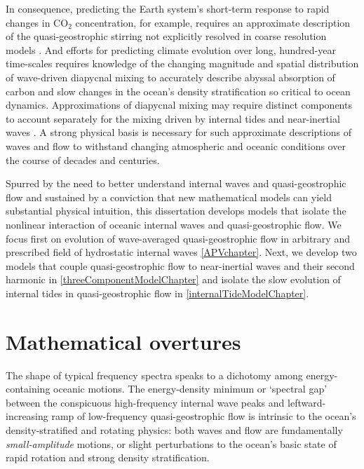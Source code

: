 \documentclass[12pt, oneside]{book}
\begin{document}
In consequence, predicting the Earth system's short-term response to rapid changes in CO$_2$ concentration, for example, requires an approximate description of the quasi-geostrophic stirring not explicitly resolved in coarse resolution models \citep{danabasoglu2012ccsm4,danabasoglu2007effects}.  And efforts for predicting climate evolution over long, hundred-year time-scales requires knowledge of the changing magnitude and spatial distribution of wave-driven diapycnal mixing to accurately describe abyssal absorption of carbon and slow changes in the ocean's density stratification so critical to ocean dynamics.  Approximations of diapycnal mixing may require distinct components to account separately for the mixing driven by internal tides \citep{melet2013sensitivity, green2013comparison,olbers2013global} and near-inertial waves \citep{melet2014sensitivity,jochum2013impact}.  A strong physical basis is necessary for such approximate descriptions of waves and flow to withstand changing atmospheric and oceanic conditions over the course of decades and centuries.

Spurred by the need to better understand internal waves and quasi-geostrophic flow and sustained by a conviction that new mathematical models can yield substantial physical intuition, this dissertation develops models that isolate the nonlinear interaction of oceanic internal waves and quasi-geostrophic flow.  We focus first on evolution of wave-averaged quasi-geostrophic flow in arbitrary and prescribed field of hydrostatic internal waves \ch \ref{APVchapter}.  Next, we develop two models that couple quasi-geostrophic flow to near-inertial waves and their second harmonic in \ch \ref{threeComponentModelChapter} and isolate the slow evolution of internal tides in quasi-geostrophic flow in \ch \ref{internalTideModelChapter}.

\section{Mathematical overtures}

The shape of typical frequency spectra speaks to a dichotomy among energy-containing oceanic motions.  The energy-density minimum or `spectral gap' between the conspicuous high-frequency internal wave peaks and leftward-increasing ramp of low-frequency quasi-geostrophic flow is intrinsic to the ocean's density-stratified and rotating physics: both waves and flow are fundamentally \textit{small-amplitude} motions, or slight perturbations to the ocean's basic state of rapid rotation and strong density stratification.  
\end{document}
